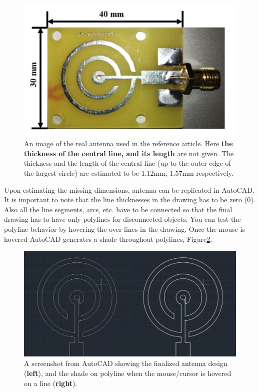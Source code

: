 \begin{figure}[H]
    \centering
	\includegraphics[angle=0,origin=c,width = .8\linewidth]{Section_ODMR_Antenna/Figures/RealAntenna.png}
    \caption{An image of the real antenna used in the reference article. Here \textbf{the thickness of
    the central line, and its length} are not given. The thickness and the length of the central line
	(up to the outer edge of the largest circle) are estimated to be 1.12mm, 1.57mm respectively.}
    \label{fig:RealAntenna}
\end{figure}

Upon estimating the missing dimensions, antenna can be replicated in AutoCAD. It is important
to note that the line thicknesses in the drawing has to be zero (0). Also all the line segments,
arcs, etc. have to be connected so that the final drawing has to have only polylines for disconnected
objects. You can test the polyline behavior by hovering the over lines in the drawing. Once the 
mouse is hovered AutoCAD generates a shade throughout polylines, Figure\ref{fig:ShadedUnshaded}.

\begin{figure}[H]
	\centering
	\includegraphics[angle=0,origin=c,width = .8\linewidth]{Section_ODMR_Antenna/Figures/ShadedUnshaded.png}
	\caption{A screenshot from AutoCAD showing the finalized antenna design (\textbf{left}), and
		the shade on polyline when the mouse/cursor is hovered on a line (\textbf{right}).}
	\label{fig:ShadedUnshaded}
\end{figure}

